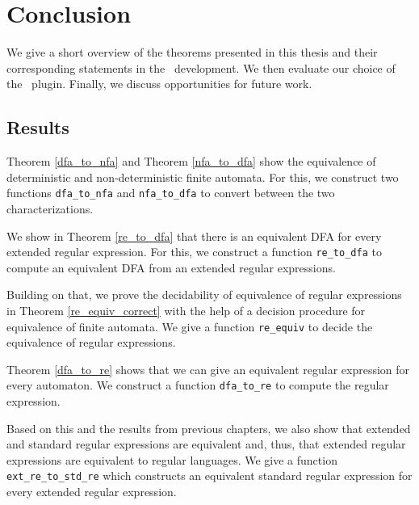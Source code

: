 \chapter{Conclusion}
We give a short overview of the theorems presented in this thesis and their corresponding statements in the \coq\ development.
We then evaluate our choice of the \ssreflect\ plugin.
Finally, we discuss opportunities for future work. 

\section{Results}
\label{chap:conclusion}
Theorem \ref{dfa_to_nfa} and Theorem \ref{nfa_to_dfa} 
show the equivalence of deterministic and non-deterministic finite automata.
For this, we construct two functions \lstinline{dfa_to_nfa} and \lstinline{nfa_to_dfa} to convert between the two characterizations.

We show in Theorem \ref{re_to_dfa} that there is an equivalent DFA for every extended regular expression. 
For this, we construct a function \lstinline{re_to_dfa} to compute an equivalent DFA from an extended regular expressions.

Building on that, we prove the decidability of equivalence of regular expressions in Theorem \ref{re_equiv_correct} with the help of a decision procedure for equivalence of finite automata.
We give a function \lstinline{re_equiv} to decide the equivalence of regular expressions.

Theorem \ref{dfa_to_re} shows that we can give an equivalent regular expression for every automaton. 
We construct a function \lstinline{dfa_to_re} to compute the regular expression.

Based on this and the results from previous chapters, we also show that extended and standard regular expressions are equivalent and, thus, that extended regular expressions are equivalent to regular languages.
We give a function \lstinline{ext_re_to_std_re} which constructs an equivalent standard regular expression for every extended regular expression.

